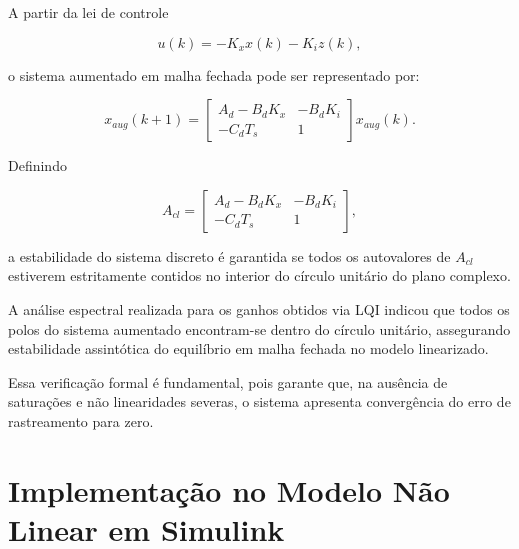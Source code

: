 A partir da lei de controle

\begin{equation}
u(k) = -K_x x(k) - K_i z(k),
\end{equation}

o sistema aumentado em malha fechada pode ser representado por:

\begin{equation}
x_{aug}(k+1) =
\begin{bmatrix}
A_d - B_d K_x & - B_d K_i \\
- C_d T_s & 1
\end{bmatrix}
x_{aug}(k).
\end{equation}

Definindo

\begin{equation}
A_{cl} =
\begin{bmatrix}
A_d - B_d K_x & - B_d K_i \\
- C_d T_s & 1
\end{bmatrix},
\end{equation}

a estabilidade do sistema discreto é garantida se todos os autovalores de $A_{cl}$ estiverem estritamente contidos no interior do círculo unitário do plano complexo.

A análise espectral realizada para os ganhos obtidos via LQI indicou que todos os polos do sistema aumentado encontram-se dentro do círculo unitário, assegurando estabilidade assintótica do equilíbrio em malha fechada no modelo linearizado.

Essa verificação formal é fundamental, pois garante que, na ausência de saturações e não linearidades severas, o sistema apresenta convergência do erro de rastreamento para zero.


\section{Implementação no Modelo Não Linear em Simulink}
\label{sec:implementacao-simulink}

